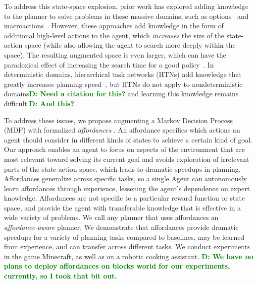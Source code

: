 \documentclass[conference]{IEEEtran}
\newcommand{\dnote}[1]{\textcolor{Green}{\textbf{D: #1}}}
\begin{document}
To address this state-space explosion, prior work has explored adding
knowledge to the planner to solve problems in these massive domains,
such as options~\cite{sutton99} and
macroactions~\cite{Botea:2005kx,Newton:2005vn}. However, these
approaches add knowledge in the form of additional high-level actions
to the agent, which {\em increases} the size of the state-action space
(while also allowing the agent to search more deeply within the
space).  The resulting augmented space is even larger, which can have
the paradoxical effect of increasing the search time for a good
policy~\cite{Jong:2008zr}.  In deterministic domains, hierarchical
task networks (HTNs) add knowledge that greatly increases planning
speed~\citep{Nau:1999:SSH:1624312.1624357}, but HTNs do not apply
to nondeterministic domains\dnote{Need a citation for this?} and
learning this knowledge remains difficult.\dnote{And this?}


To address these issues, we propose augmenting a Markov Decision
Process (MDP) with formalized {\em affordances} \cite{gibson77}.  An
affordance specifies which actions an agent should consider in
different kinds of states to achieve a certain kind of goal.  Our
approach enables an agent to focus on aspects of the environment that
are most relevant toward solving its current goal and avoids
exploration of irrelevant parts of the state-action space, which leads
to dramatic speedups in planning.  Affordances generalize across
specific tasks, so a single Agent can autonomously learn affordances
through experience, lessening the agent's dependence on expert
knowledge. Affordances are not specific to a particular reward
function or state space, and provide the agent with transferable
knowledge that is effective in a wide variety of problems. We call any
planner that uses affordances an {\it affordance-aware} planner.  We
demonstrate that affordances provide dramatic speedups for a variety
of planning tasks compared to baselines, may be learned from
experience, and can transfer across different tasks.  We conduct experiments
in the game Minecraft, as well as on a robotic cooking assistant. 
\dnote{We have no plans to deploy affordances on blocks world for our experiments, currently, so I took that bit out.}

\end{document}
